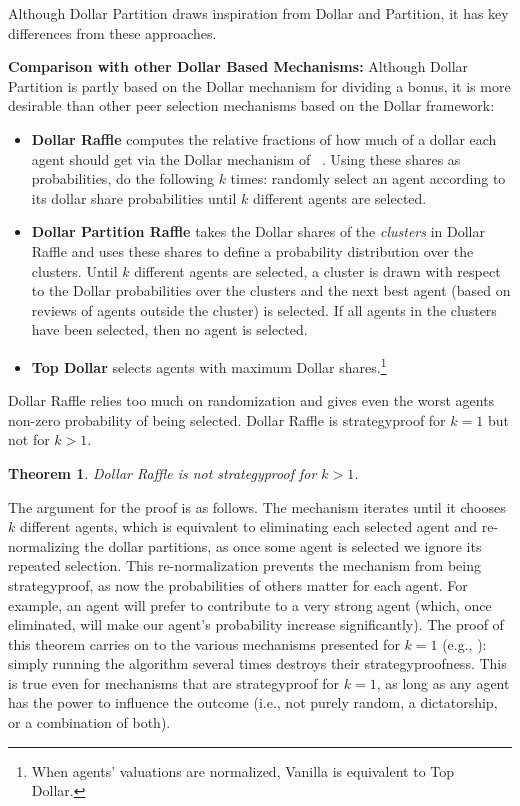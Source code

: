 \documentclass[letterpaper]{article}
\newtheorem{theorem}{Theorem}
\newcommand{\citet}[1]{\citeauthor{#1}~\shortcite{#1}}
\begin{document}
Although Dollar Partition draws inspiration from Dollar and Partition, it has key differences from these approaches.


\smallskip
\noindent
\textbf{Comparison with other Dollar Based Mechanisms:}\;
Although Dollar Partition is partly based on the Dollar mechanism for dividing a bonus, it is more desirable than other peer selection mechanisms based on the Dollar framework:
\begin{itemize}[leftmargin=*]
	\setlength\itemsep{0em}
\item \textbf{Dollar Raffle} computes the relative fractions of how much of a dollar each agent should get via the Dollar mechanism of \citet{CMT08a}. Using these shares as probabilities, do the following $k$ times: randomly select an agent according to its dollar share probabilities until $k$ different agents are selected.
\item \textbf{Dollar Partition Raffle} takes the Dollar shares of the \emph{clusters} in Dollar Raffle and uses these shares to define a probability distribution over the clusters. Until $k$ different agents are selected, a cluster is drawn with respect to the Dollar probabilities over the clusters and the next best agent (based on reviews of agents outside the cluster) is selected. If all agents in the clusters have been selected, then no agent is selected.
\item \textbf{Top Dollar} selects agents with maximum Dollar shares.\footnote{When agents' valuations are normalized, Vanilla is equivalent to Top Dollar.}
\end{itemize}

Dollar Raffle relies too much on randomization and gives even the worst agents non-zero probability of being selected. Dollar Raffle is strategyproof for $k=1$ but not for $k>1$.

\begin{theorem}
	Dollar Raffle is not strategyproof for $k>1$.
\end{theorem}
The argument for the proof is as follows. The mechanism iterates until it chooses $k$ different agents, which is equivalent to eliminating each selected agent and re-normalizing the dollar partitions, as once some agent is selected we ignore its repeated selection. This re-normalization prevents the mechanism from being strategyproof, as now the probabilities of others matter for each agent. For example, an agent will prefer to contribute to a very strong agent (which, once eliminated, will make our agent's probability increase significantly).
The proof of this theorem carries on to the various mechanisms presented for $k=1$ (e.g., \cite{FeKl14a}): simply running the algorithm several times destroys their strategyproofness. This is true even for mechanisms that are strategyproof for $k=1$, as long as any agent has the power to influence the outcome (i.e., not purely random, a dictatorship, or a combination of both).
\end{document}
